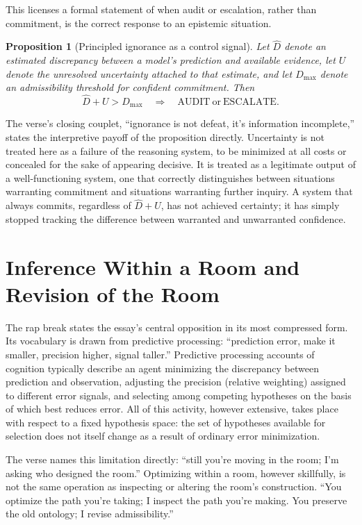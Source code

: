 \documentclass[11pt]{article}
\newtheorem{proposition}[definition]{Proposition}
\begin{document}
This licenses a formal statement of when audit or escalation, rather than commitment, is the correct response to an epistemic situation.

\begin{proposition}[Principled ignorance as a control signal]
Let $\widehat{D}$ denote an estimated discrepancy between a model's prediction and available evidence, let $U$ denote the unresolved uncertainty attached to that estimate, and let $D_{\max}$ denote an admissibility threshold for confident commitment. Then
\[
\widehat{D} + U > D_{\max} \quad \Longrightarrow \quad \mathrm{AUDIT}\ \text{or}\ \mathrm{ESCALATE}.
\]
\end{proposition}

The verse's closing couplet, ``ignorance is not defeat, it's information incomplete,'' states the interpretive payoff of the proposition directly. Uncertainty is not treated here as a failure of the reasoning system, to be minimized at all costs or concealed for the sake of appearing decisive. It is treated as a legitimate output of a well-functioning system, one that correctly distinguishes between situations warranting commitment and situations warranting further inquiry. A system that always commits, regardless of $\widehat{D}+U$, has not achieved certainty; it has simply stopped tracking the difference between warranted and unwarranted confidence.

\section{Inference Within a Room and Revision of the Room}

The rap break states the essay's central opposition in its most compressed form. Its vocabulary is drawn from predictive processing: ``prediction error, make it smaller, precision higher, signal taller.'' Predictive processing accounts of cognition typically describe an agent minimizing the discrepancy between prediction and observation, adjusting the precision (relative weighting) assigned to different error signals, and selecting among competing hypotheses on the basis of which best reduces error. All of this activity, however extensive, takes place with respect to a fixed hypothesis space: the set of hypotheses available for selection does not itself change as a result of ordinary error minimization.

The verse names this limitation directly: ``still you're moving in the room; I'm asking who designed the room.'' Optimizing within a room, however skillfully, is not the same operation as inspecting or altering the room's construction. ``You optimize the path you're taking; I inspect the path you're making. You preserve the old ontology; I revise admissibility.''
\end{document}
